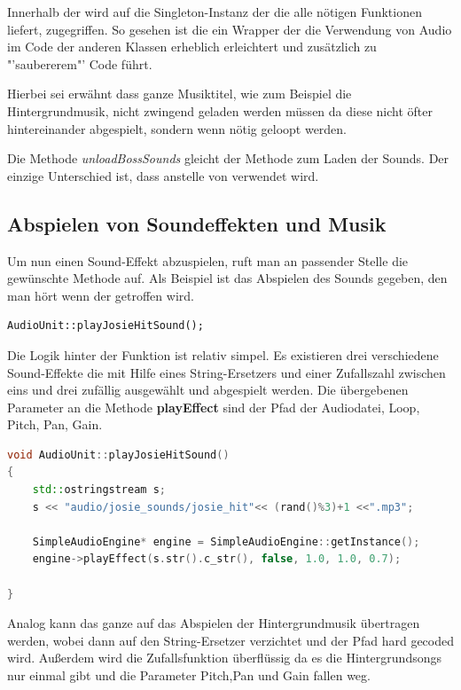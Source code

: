 Innerhalb der  wird auf die Singleton-Instanz der  die alle nötigen Funktionen liefert, zugegriffen. So gesehen ist die  ein Wrapper der die Verwendung von Audio im Code der anderen Klassen erheblich erleichtert und zusätzlich zu "'saubererem"' Code führt. 

Hierbei sei erwähnt dass ganze Musiktitel, wie zum Beispiel die Hintergrundmusik, nicht zwingend geladen werden müssen da diese nicht öfter hintereinander abgespielt, sondern wenn nötig geloopt werden. 

Die Methode \textit{unloadBossSounds} gleicht der Methode zum Laden der Sounds. Der einzige Unterschied ist, dass  anstelle von  verwendet wird.

\subsection{Abspielen von Soundeffekten und Musik} 
Um nun einen Sound-Effekt abzuspielen, ruft man an passender Stelle die gewünschte Methode auf. Als Beispiel ist das Abspielen des Sounds gegeben, den man hört wenn der  getroffen wird.

\begin{lstlisting}[style=singleline]
AudioUnit::playJosieHitSound();
\end{lstlisting}

Die Logik hinter der Funktion ist relativ simpel. Es existieren drei verschiedene Sound-Effekte die mit Hilfe eines String-Ersetzers und einer Zufallszahl zwischen eins und drei zufällig ausgewählt und abgespielt werden. Die übergebenen Parameter an die Methode \textbf{playEffect} sind der Pfad der Audiodatei, Loop, Pitch, Pan, Gain.

\begin{lstlisting}[label=lst:playJosieShootSound,
				   language=C++,
				   firstnumber=30,
				   caption=BossLevel Shoot Sound abspielen ( AudioUnit.cpp )]
void AudioUnit::playJosieHitSound()
{
	std::ostringstream s;
	s << "audio/josie_sounds/josie_hit"<< (rand()%3)+1 <<".mp3";

	SimpleAudioEngine* engine = SimpleAudioEngine::getInstance();
	engine->playEffect(s.str().c_str(), false, 1.0, 1.0, 0.7);
	
}
\end{lstlisting}

Analog kann das ganze auf das Abspielen der Hintergrundmusik übertragen werden, wobei dann auf den String-Ersetzer verzichtet und der Pfad hard gecoded wird. Außerdem wird die Zufallsfunktion überflüssig da es die Hintergrundsongs nur einmal gibt und die Parameter Pitch,Pan und Gain fallen weg.



